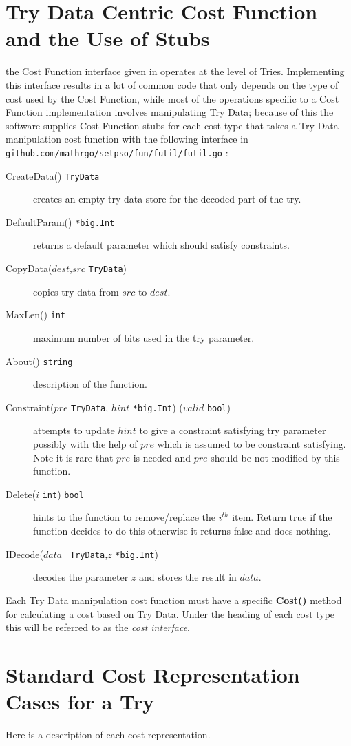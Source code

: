 \documentclass[a4paper,oneside,english]{book}
\numberwithin{equation}{section}
\numberwithin{figure}{section}
\newcommand{\codesorc}[1]{\texttt{github.com/mathrgo/setpso/#1}}
\begin{document}
\section{Try Data Centric Cost Function and the Use of Stubs \label{sec:Stubs}}
the Cost Function interface given in operates at the level of Tries. Implementing this interface results in a lot of common code that only depends on the type of cost used by the Cost Function, while most of the operations specific to a Cost Function implementation involves manipulating Try Data; because of this the software supplies Cost Function stubs for each cost type that takes a Try Data manipulation cost function with the following interface in \codesorc{fun/futil/futil.go} :
\begin{description}
	\item[CreateData() \texttt{TryData}] creates an empty try data store for the decoded part of the try.
	\item[DefaultParam() \texttt{*big.Int}]  returns a default parameter which should satisfy constraints.
	\item[CopyData($ dest $,$  src $ \texttt{TryData})] copies try data from $ src  $ to $ dest $.
	\item[MaxLen() \texttt{int}] maximum number of bits used in the try parameter.
	\item[About() \texttt{string}] description of the function.
	\item[Constraint($ pre $ \texttt{TryData}, $ hint $ \texttt{*big.Int}) ($ valid $ \texttt{bool})] attempts to update $ hint $ to give a constraint satisfying try parameter possibly with the help of $ pre  $ which is assumed to be constraint satisfying. Note it is rare that $ pre $ is needed and $ pre $ should be not modified by this function.
	\item[Delete($ i  $ \texttt{int}) \texttt{bool}]  hints to the function to remove/replace the $  i^{th} $ item. Return true if the function decides to do this otherwise it returns false and does nothing.
	\item[IDecode($ data $ \texttt{ TryData},$  z $ \texttt{*big.Int})] decodes the parameter $ z $ and stores the result in $ data $.

\end{description}   
	Each Try Data manipulation cost function must have  a specific \textbf{Cost()} method for calculating a cost based on Try Data. Under the heading of each cost type  this will be referred to as the \emph{cost interface}.

\section{Standard Cost Representation Cases for a Try}
Here is a description of each cost representation.
\end{document}
